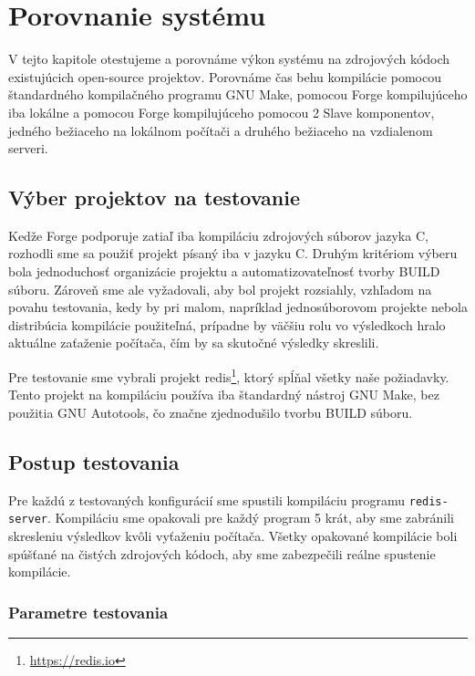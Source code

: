\chapter{Porovnanie syst\'{e}mu}
\label{ch:comp}

V tejto kapitole otestujeme a porovnáme výkon systému na zdrojových kódoch
existujúcich open-source projektov. Porovnáme čas behu kompilácie pomocou štandardného
kompilačného programu GNU Make, pomocou Forge kompilujúceho iba lokálne a pomocou
Forge kompilujúceho pomocou 2 Slave komponentov, jedného bežiaceho na lokálnom počítači
a druhého bežiaceho na vzdialenom serveri.

\section{V\'{y}ber projektov na testovanie}
\label{sec:projectchoice}

Kedže Forge podporuje zatiaľ iba kompiláciu zdrojových súborov jazyka C, rozhodli
sme sa použiť projekt písaný iba v jazyku C. Druhým kritériom výberu bola jednoduchosť
organizácie projektu a automatizovateľnosť tvorby BUILD súboru. Zároveň sme ale
vyžadovali, aby bol projekt rozsiahly, vzhľadom na povahu testovania, kedy by pri
malom, napríklad jednosúborovom projekte nebola distribúcia kompilácie použiteľná,
prípadne by väčšiu rolu vo výsledkoch hralo aktuálne zaťaženie počítača, čím by sa
skutočné výsledky skreslili.

Pre testovanie sme vybrali projekt redis\footnote{\url{https://redis.io}}, ktorý
spĺňal všetky naše požiadavky. Tento projekt na kompiláciu používa iba štandardný
nástroj GNU Make, bez použitia GNU Autotools, čo značne zjednodušilo tvorbu BUILD
súboru.

\section{Postup testovania}
\label{sec:process}

Pre každú z testovaných konfigurácií sme spustili kompiláciu programu \texttt{redis-server}.
Kompiláciu sme opakovali pre každý program 5 krát, aby sme zabránili skresleniu výsledkov
kvôli vyťaženiu počítača. Všetky opakované kompilácie boli spúšťané na čistých zdrojových
kódoch, aby sme zabezpečili reálne spustenie kompilácie.

\subsection{Parametre testovania}
\label{sec:process:params}

